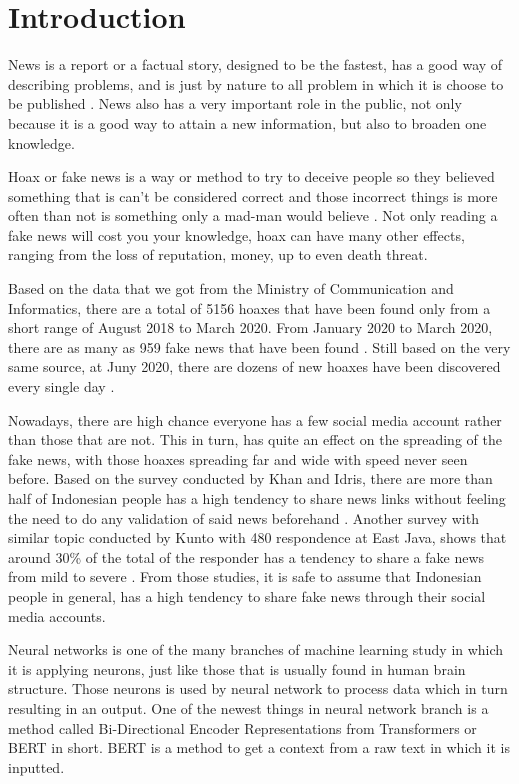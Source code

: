 \section{Introduction}
\label{sec:Introduction}

News is a report or a factual story, designed to be the fastest, has a good way of describing problems, and is just by nature to all problem in which it is choose to be published \cite{rani2013persepsi}. News also has a very important role in the public, not only because it is a good way to attain a new information, but also to broaden one knowledge.

Hoax or fake news is a way or method to try to deceive people so they believed something that is can't be considered correct and those incorrect things is more often than not is something only a mad-man would believe \cite{berita_bohong}. Not only reading a fake news will cost you your knowledge, hoax can have many other effects, ranging from the loss of reputation, money, up to even death threat.

Based on the data that we got from the Ministry of Communication and Informatics, there are a total of 5156 hoaxes that have been found only from a short range of August 2018 to March 2020. From January 2020 to March 2020, there are as many as 959 fake news that have been found \cite{kominfoStatHoax}. Still based on the very same source, at Juny 2020, there are dozens of new hoaxes have been discovered every single day \cite{kominfoJuni2020}.

Nowadays, there are high chance everyone has a few social media account rather than those that are not. This in turn, has quite an effect on the spreading of the fake news, with those hoaxes spreading far and wide with speed never seen before. Based on the survey conducted by Khan and Idris, there are more than half of Indonesian people has a high tendency to share news links without feeling the need to do any validation of said news beforehand \cite{khan}. Another survey with similar topic conducted by Kunto with 480 respondence at East Java, shows that around 30\% of the total of the responder has a tendency to share a fake news from mild to severe \cite{kuntoUmur}. From those studies, it is safe to assume that Indonesian people in general, has a high tendency to share fake news through their social media accounts.

Neural networks is one of the many branches of machine learning study in which it is applying neurons, just like those that is usually found in human brain structure. Those neurons is used by neural network to process data which in turn resulting in an output. One of the newest things in neural network branch is a method called Bi-Directional Encoder Representations from Transformers or BERT in short. BERT is a method to get a context from a raw text in which it is inputted.

